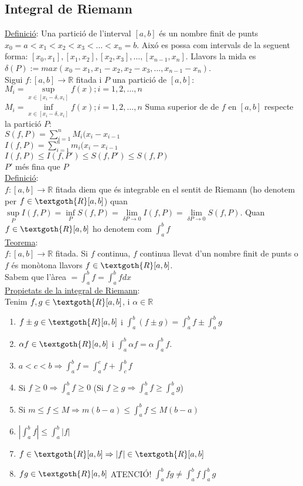 \subsection{Integral de Riemann}
\underline{Definició}: Una partició de l'interval $[a, b]$ és un nombre finit de punts $x_0 = a < x_1 < x_2 < x_3 < \dots < x_n = b$. Aixó es possa com intervals de la seguent forma: $[x_0, x_1], [x_1, x_2], [x_2, x_3],\dots, [x_{n-1}, x_n]$. Llavors la mida es $\delta(P) := max(x_0 - x_1, x_1 - x_2, x_2 - x_3,\dots, x_{n-1} - x_n)$.\\
Sigui $f: [a, b] \rightarrow \mathbb{R}$ fitada i $P$ una partició de $[a, b]$:\\
$M_i = \sup\limits_{x \in [x_i-\delta, x_i]} f(x); i = 1, 2,\dots, n$\\
$M_i = \inf\limits_{x \in [x_i-\delta, x_i]} f(x); i = 1, 2,\dots, n$
Suma superior de de $f$ en $[a, b]$ respecte la partició $P$:\\
$S(f, P) = \sum\limits_{i=1}^n M_i(x_i-x_{i-1}$\\
$I(f, P) = \sum\limits_{i=1}^n m_i(x_i-x_{i-1}$\\
$I(f, P) \leq I(f, P') \leq S(f, P') \leq S(f, P)$\\
$P'$ més fina que $P$\\
\underline{Definició}:\\
$f: [a, b] \rightarrow \mathbb{R}$ fitada diem que és integrable en el sentit de Riemann (ho denotem per $f \in \textgoth{R}[a, b]$) quan $\sup\limits_P I(f, P) = \inf\limits_P S(f, P) = \lim\limits_{\delta{P} \rightarrow 0} I(f,P) = \lim\limits_{\delta{P} \rightarrow 0} S(f,P)$. Quan $f \in \textgoth{R}[a, b]$ ho denotem com $\int_a^b f$\\
\underline{Teorema}:\\
$f:[a, b] \rightarrow \mathbb{R}$ fitada. Si $f$ continua, $f$ continua llevat d'un nombre finit de punts o $f$ és monòtona llavors $f \in \textgoth{R}[a, b]$.\\
Sabem que l'àrea $= \int_a^b f = \int_a^b f dx$\\
\underline{Propietats de la integral de Riemann}:\\
Tenim $f, g \in \textgoth{R}[a, b]$, i $\alpha \in \mathbb{R}$\\
\begin{enumerate}
    \item $f\pm g \in \textgoth{R}[a, b]$ i $\int_a^b (f\pm g) = \int_a^b f \pm \int_a^b g$
    \item $\alpha f \in \textgoth{R}[a, b]$ i $\int_a^b \alpha f = \alpha \int_a^b f$.
    \item $a < c < b \Rightarrow \int_a^b f = \int_a^c f + \int_c^b f$
    \item Si $f \geq 0 \Rightarrow \int_a^b f \geq 0$ (Si $f \geq g \Rightarrow \int_a^b f \geq \int_a^b g$)
    \item Si $m \leq f \leq M \Rightarrow m(b-a) \leq \int_a^b f \leq M(b-a)$
    \item $|\int_a^b f| \leq \int_a^b |f|$
    \item $f \in \textgoth{R}[a, b] \Rightarrow |f| \in \textgoth{R}[a, b]$
    \item $fg \in \textgoth{R}[a, b]$ ATENCIÓ! $\int_a^b fg \neq \int_a^b f \int_a^b g$
\end{enumerate}
